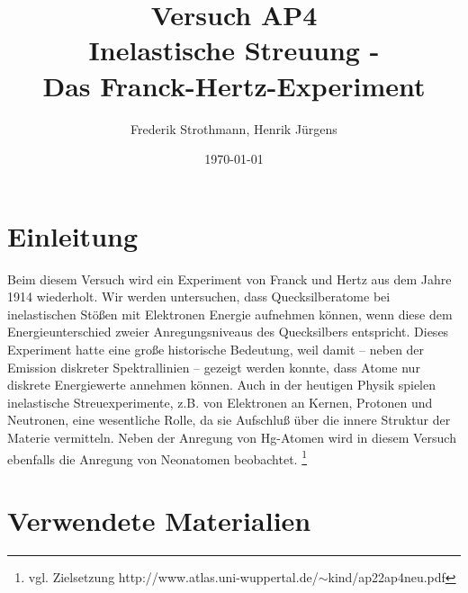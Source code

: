 \documentclass[12pt,a4paper]{article}
\title{Versuch AP4\\ Inelastische Streuung -\\ Das Franck-Hertz-Experiment}
\author{Frederik Strothmann, Henrik Jürgens}
\date{\today}
\begin{document}
\maketitle
\newpage
\tableofcontents
\newpage
\section{Einleitung}
Beim diesem Versuch wird ein Experiment von Franck und Hertz aus dem Jahre 1914 wiederholt. Wir werden untersuchen, dass Quecksilberatome bei inelastischen Stößen mit Elektronen Energie aufnehmen können, wenn diese dem Energieunterschied zweier Anregungsniveaus des Quecksilbers entspricht. Dieses Experiment hatte eine große historische Bedeutung, weil damit -- neben der Emission diskreter Spektrallinien -- gezeigt werden konnte, dass Atome nur diskrete Energiewerte annehmen können. Auch in der heutigen Physik spielen inelastische Streuexperimente, z.B. von Elektronen an Kernen, Protonen und Neutronen, eine wesentliche Rolle, da sie Aufschluß über die innere Struktur der Materie vermitteln. Neben der Anregung von Hg-Atomen wird in diesem Versuch ebenfalls die Anregung von Neonatomen beobachtet. \footnote{vgl. Zielsetzung http://www.atlas.uni-wuppertal.de/$\sim$kind/ap22ap4neu.pdf}
\section{Verwendete Materialien}
\end{document}
